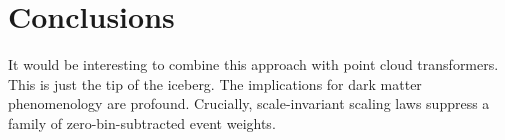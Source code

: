 \section{Conclusions}\label{sec:conclusions}

It would be interesting to combine this approach with point cloud
transformers. This is just the tip of the iceberg. The implications for
dark matter phenomenology are profound. Crucially, scale-invariant
scaling laws suppress a family of zero-bin-subtracted event weights.


